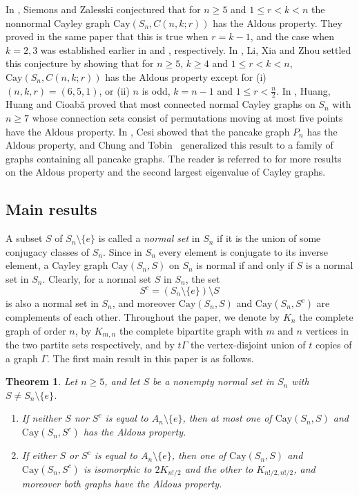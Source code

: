 \documentclass[12pt, a4paper]{article}
\newtheorem{thm}{Theorem}[section]
\theoremstyle{definition}
\begin{document}
In \cite{SZ}, Siemons and Zalesski conjectured that for $n \ge 5$ and $1 \leq r < k < n$ the nonnormal Cayley graph $\mathrm{Cay}(S_n,C(n,k;r))$ has the Aldous property. They proved in the same paper that this is true when $r=k-1$, and the case when $k = 2,3$ was established earlier in \cite{FOW} and \cite{HH}, respectively. In \cite[Theorem 1.3]{LXZJCTA2026}, Li, Xia and Zhou settled this conjecture by showing that for $n \ge 5$, $k \ge 4$ and $1 \leq r < k < n$, $\mathrm{Cay}(S_n,C(n,k;r))$ has the Aldous property except for (i) $(n,k,r) = (6,5,1)$, or (ii) $n$ is odd, $k=n-1$ and $1 \leq r < \frac{n}{2}$. In \cite{HH2}, Huang, Huang and Cioab\u{a} proved that most connected normal Cayley graphs on $S_n$ with $n\geq 7$ whose connection sets consist of permutations moving at most five points have the Aldous property. In \cite{C1}, Cesi showed that the pancake graph $P_n$ has the Aldous property, and Chung and Tobin~\cite{CT} generalized this result to a family of graphs containing all pancake graphs. The reader is referred to \cite[Section 8]{LZ} for more results on the Aldous property and the second largest eigenvalue of Cayley graphs. 

\subsection{Main results} 

A subset $S$ of $S_n \setminus \{e\}$ is called \cite{PP} a \emph{normal set} in $S_n$ if it is the union of some conjugacy classes of $S_n$. Since in $S_n$ every element is conjugate to its inverse element, a Cayley graph $\mathrm{Cay}(S_n,S)$ on $S_n$ is normal if and only if $S$ is a normal set in $S_n$. Clearly, for a normal set $S$ in $S_n$, the set 
$$
S^c=(S_n\setminus\{e\})\setminus S
$$
is also a normal set in $S_n$, and moreover $\mathrm{Cay}(S_n,S)$ and $\mathrm{Cay}(S_n,S^c)$ are complements of each other. Throughout the paper, we denote by $K_n$ the complete graph of order $n$, by $K_{m,n}$ the complete bipartite graph with $m$ and $n$ vertices in the two partite sets respectively, and by $t\Gamma$ the vertex-disjoint union of $t$ copies of a graph $\Gamma$. The first main result in this paper is as follows. 

\begin{thm}\label{thm:complement}
Let $n \ge 5$, and let $S$ be a nonempty normal set in $S_n$ with $S\neq S_n\setminus\{e\}$.
\begin{enumerate}[\rm (a)]
\item
If neither $S$ nor $S^c$ is equal to $A_n\setminus\{e\}$, then at most one of $\mathrm{Cay}(S_n,S)$ and $\mathrm{Cay}(S_n,S^c)$ has the Aldous property.
\item 
If either $S$ or $S^c$ is equal to $A_n\setminus\{e\}$, then one of $\mathrm{Cay}(S_n, S)$ and $\mathrm{Cay}(S_n, S^c)$ is isomorphic to $2K_{n!/2}$ and the other to $K_{n!/2,n!/2}$, and moreover both graphs have the Aldous property. 
\end{enumerate}
\end{thm}
\end{document}
